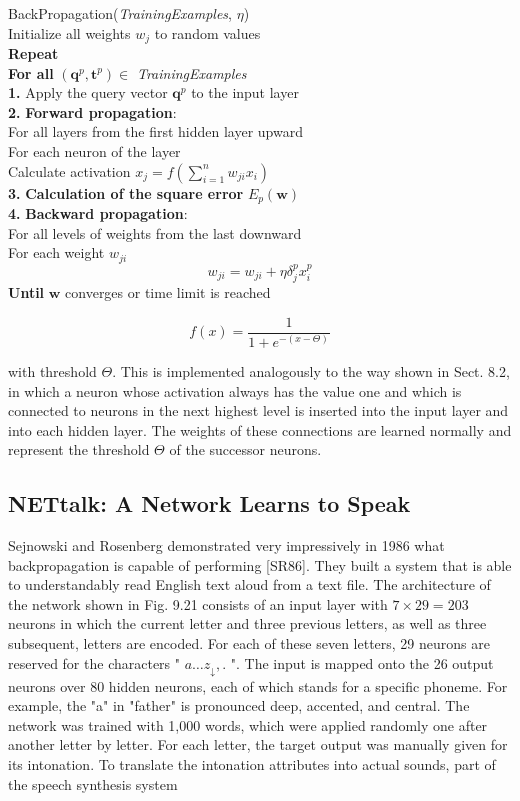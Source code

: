 \documentclass[10pt]{book}
\begin{document}
BackPropagation(\textit{TrainingExamples}, $\eta$)\\
Initialize all weights $w_{j}$ to random values\\
\textbf{Repeat}\\
\textbf{For all} $\left(\boldsymbol{q}^{p}, \boldsymbol{t}^{p}\right) \in$ \textit{TrainingExamples}\\
\textbf{1.} Apply the query vector $\boldsymbol{q}^{p}$ to the input layer\\
\textbf{2.} \textbf{Forward propagation}:\\
For all layers from the first hidden layer upward\\
For each neuron of the layer\\
Calculate activation $x_{j}=f\left(\sum_{i=1}^{n} w_{j i} x_{i}\right)$\\
\textbf{3.} \textbf{Calculation of the square error} $E_{p}(\boldsymbol{w})$\\
\textbf{4.} \textbf{Backward propagation}:\\
For all levels of weights from the last downward\\
For each weight $w_{j i}$\\
$$
w_{j i}=w_{j i}+\eta \delta_{j}^{p} x_{i}^{p}
$$
\textbf{Until} $\boldsymbol{w}$ converges or time limit is reached

$$
f(x)=\frac{1}{1+e^{-(x-\Theta)}}
$$

with threshold $\Theta$. This is implemented analogously to the way shown in Sect. 8.2, in which a neuron whose activation always has the value one and which is connected to neurons in the next highest level is inserted into the input layer and into each hidden layer. The weights of these connections are learned normally and represent the threshold $\Theta$ of the successor neurons.
\subsection{NETtalk: A Network Learns to Speak}
Sejnowski and Rosenberg demonstrated very impressively in 1986 what backpropagation is capable of performing [SR86]. They built a system that is able to understandably read English text aloud from a text file. The architecture of the network shown in Fig. 9.21 consists of an input layer with $7 \times 29=203$ neurons in which the current letter and three previous letters, as well as three subsequent, letters are encoded. For each of these seven letters, 29 neurons are reserved for the characters " $a \ldots z_{\downarrow},$. ". The input is mapped onto the 26 output neurons over 80 hidden neurons, each of which stands for a specific phoneme. For example, the "a" in "father" is pronounced deep, accented, and central. The network was trained with 1,000 words, which were applied randomly one after another letter by letter. For each letter, the target output was manually given for its intonation. To translate the intonation attributes into actual sounds, part of the speech synthesis system
\end{document}
